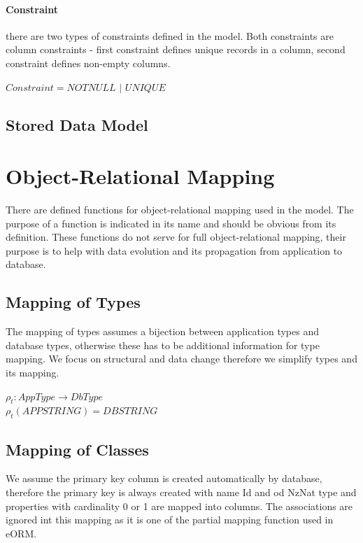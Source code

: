 \documentclass[11pt]{article}
\begin{document}
\paragraph{Constraint} there are two types of constraints defined in the model. Both constraints are column constraints - first constraint defines unique records in a column, second constraint defines non-empty columns.

\begin{center}
$Constraint = NOTNULL$ $|$ $UNIQUE $
\end{center}

\subsection{Stored Data Model}

\section{Object-Relational Mapping}
There are defined functions for object-relational mapping used in the model. The purpose of a function is indicated in its name and should be obvious from its definition. These functions do not serve for full object-relational mapping, their purpose is to help with data evolution and its propagation from application to database.


\subsection{Mapping of Types}
The mapping of types assumes a bijection between application types and database types, otherwise these has to be additional information for type mapping. We focus on structural and data change therefore we simplify types and its mapping.

\begin{center}
$ \rho_{t} : AppType \rightarrow DbType $ \\
$ \rho_{t}(APPSTRING) = DBSTRING $
\end{center}




\subsection{Mapping of Classes}
We assume the primary key column is created automatically by database, therefore the primary key is always created with name Id and od NzNat type and properties with cardinality 0 or 1 are mapped into columns. The associations are ignored int this mapping as it is one of the partial mapping function used in eORM.
\end{document}
